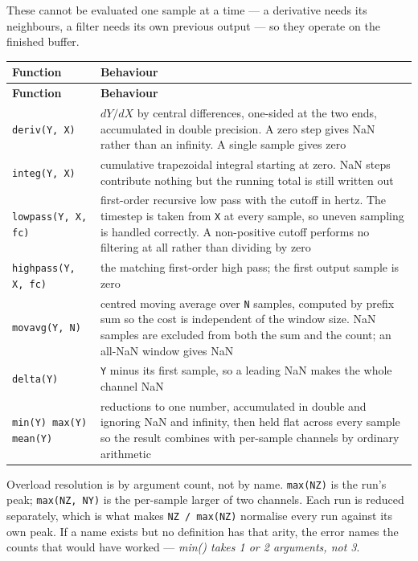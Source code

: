 \documentclass[11pt,a4paper,oneside]{report}
\newcommand{\code}[1]{\texttt{#1}}
\begin{document}
These cannot be evaluated one sample at a time --- a derivative needs its
neighbours, a filter needs its own previous output --- so they operate on the
finished buffer.

\begin{center}
\small
\begin{longtable}{@{}p{}p{}@{}}
\toprule
\textbf{Function} & \textbf{Behaviour} \\
\midrule
\endfirsthead
\toprule
\textbf{Function} & \textbf{Behaviour} \\
\midrule
\endhead
\code{deriv(Y, X)} & $dY/dX$ by central differences, one-sided at the two ends, accumulated in double precision. A zero step gives NaN rather than an infinity. A single sample gives zero \\
\code{integ(Y, X)} & cumulative trapezoidal integral starting at zero. NaN steps contribute nothing but the running total is still written out \\
\code{lowpass(Y, X, fc)} & first-order recursive low pass with the cutoff in hertz. The timestep is taken from \code{X} at every sample, so uneven sampling is handled correctly. A non-positive cutoff performs no filtering at all rather than dividing by zero \\
\code{highpass(Y, X, fc)} & the matching first-order high pass; the first output sample is zero \\
\code{movavg(Y, N)} & centred moving average over \code{N} samples, computed by prefix sum so the cost is independent of the window size. NaN samples are excluded from both the sum and the count; an all-NaN window gives NaN \\
\code{delta(Y)} & \code{Y} minus its first sample, so a leading NaN makes the whole channel NaN \\
\code{min(Y) max(Y) mean(Y)} & reductions to one number, accumulated in double and ignoring NaN and infinity, then held flat across every sample so the result combines with per-sample channels by ordinary arithmetic \\
\bottomrule
\end{longtable}
\end{center}

Overload resolution is by argument count, not by name. \code{max(NZ)} is the
run's peak; \code{max(NZ, NY)} is the per-sample larger of two channels. Each run
is reduced separately, which is what makes \code{NZ / max(NZ)} normalise every
run against its own peak. If a name exists but no definition has that arity, the
error names the counts that would have worked --- \emph{min() takes 1 or 2
arguments, not 3}.
\end{document}
